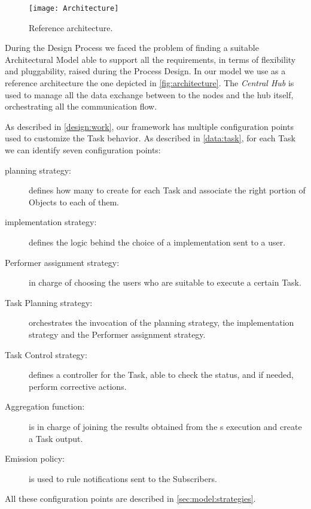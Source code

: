 \begin{figure}[htb]
	\centering
	\texttt{[image: Architecture]}
	\caption{Reference architecture.}
	\label{fig:architecture}
\end{figure}


During the Design Process we faced the problem of finding a suitable Architectural
Model able to support all the requirements, in terms of flexibility and pluggability,
raised during the Process Design. In our model we use as a reference architecture
the one depicted in \autoref{fig:architecture}. The \emph{Central Hub} is used to
manage all the data exchange between to the
nodes and the hub itself, orchestrating all the communication flow.




As described in \ref{design:work}, our framework has multiple configuration
points used to customize the Task behavior. As described in \vref{data:task},
for each Task we can identify seven configuration points:
\begin{description}
	\item[\utask{} planning strategy:] defines how many \utask{} to create for
	each Task and associate the right portion of Objects to each of them.
	\item[\utask{} implementation strategy:] defines the logic behind the choice
	of a \utask{} implementation sent to a user.
	\item[Performer assignment strategy:] in charge of choosing the users who
	are suitable to execute a certain Task.
	\item[Task Planning strategy:] orchestrates the invocation of the \utask{}
	planning strategy, the \utask{} implementation strategy and the Performer
	assignment strategy.
	\item[Task Control strategy:] defines a controller for the Task, able to
	check the status, and if needed, perform corrective actions.
	\item[Aggregation function:] is in charge of joining the results obtained
	from the \utask{}s execution and create a Task output.
	\item[Emission policy:] is used to rule notifications sent to the Subscribers.
\end{description}
All these configuration points are described in \ref{sec:model:strategies}.